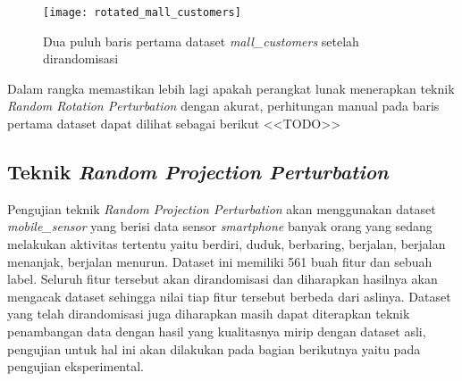 \begin{figure}
	\centering
	\texttt{[image: rotated\_mall\_customers]}
	\caption{Dua puluh baris pertama dataset \textit{mall\_customers} setelah dirandomisasi}
	\label{fig:rotated_mall_customers}
\end{figure}

Dalam rangka memastikan lebih lagi apakah perangkat lunak menerapkan teknik \textit{Random Rotation Perturbation} dengan akurat, perhitungan manual pada baris pertama dataset dapat dilihat sebagai berikut <<TODO>>

\subsection{Teknik \textit{Random Projection Perturbation}}
\label{subsec:rpp-fungsional}

Pengujian teknik \textit{Random Projection Perturbation} akan menggunakan dataset \textit{mobile\_sensor} yang berisi data sensor \textit{smartphone} banyak orang yang sedang melakukan aktivitas tertentu yaitu berdiri, duduk, berbaring, berjalan, berjalan menanjak, berjalan menurun. Dataset ini memiliki 561 buah fitur dan sebuah label. Seluruh fitur tersebut akan dirandomisasi dan diharapkan hasilnya akan mengacak dataset sehingga nilai tiap fitur tersebut berbeda dari aslinya. Dataset yang telah dirandomisasi juga diharapkan masih dapat diterapkan teknik penambangan data dengan hasil yang kualitasnya mirip dengan dataset asli, pengujian untuk hal ini akan dilakukan pada bagian berikutnya yaitu pada pengujian eksperimental.


